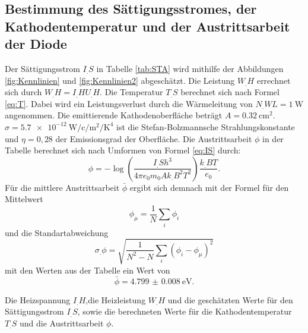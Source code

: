 \subsection{Bestimmung des Sättigungsstromes, der Kathodentemperatur und der Austrittsarbeit der Diode}

Der Sättigungsstrom $I_.S$ in Tabelle \ref{tab:STA} wird mithilfe der Abbildungen \ref{fig:Kennlinien} und \ref{fig:Kennlinien2} abgeschätzt.
Die Leistung $W_.H$ errechnet sich durch $W_.H = I_.H U_.H$.
Die Temperatur $T_.S$ berechnet sich nach Formel \eqref{eq:T}. Dabei wird ein Leistungsverlust durch die Wärmeleitung von $N_.{WL}=\SI{1}{\watt}$ angenommen. Die emittierende Kathodenoberfläche beträgt $A = \SI{0.32}{\centi\metre\squared}$. $\sigma=\SI{5.7e-12}{\watt\per\centi\per\metre\squared\per\kelvin\tothe{4}}$ ist die Stefan-Bolzmannsche Strahlungskonstante und $\eta=0,28$ der Emissionsgrad der Oberfläche.
Die Austrittsarbeit $\phi$ in der Tabelle berechnet sich nach Umformen von Formel \eqref{eq:IS} durch:
\[
\phi = -\log\left(\frac{I_.Sh^3}{4\pi e_0m_0Ak_.B^2T^2}\right)\frac{k_.BT}{e_0}\text{.}
\]
Für die mittlere Austrittsarbeit $\bar{\phi}$ ergibt sich demnach mit der Formel für den Mittelwert
\[
\phi_\mu = \frac{1}{N}\sum_i\phi_i
\]
und die Standartabweichung
\[
\sigma_.{\phi}=\sqrt{\frac{1}{N^2-N}\sum_i \left(\phi_i-\phi_\mu\right)^2}
\]
mit den Werten aus der Tabelle ein Wert von
\[
\bar{\phi} = \SI{4.799(8)}{\electronvolt}\text{.}
\]

\begin{table}
\centering
\caption{Die Heizspannung $I_.H$,die Heizleistung $W_.H$ und die geschätzten Werte für den Sättigungsstrom $I_.S$, sowie die berechneten Werte für die Kathodentemperatur $T_.S$ und die Austrittsarbeit $\phi$.}

\label{tab:STA}
\end{table}
